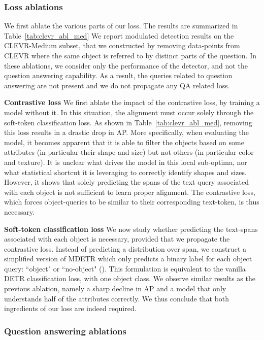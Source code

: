\subsubsection{Loss ablations}
We first ablate the various parts of our loss. The results are summarized in Table~\ref{tab:clevr_abl_med} We report modulated detection results on the CLEVR-Medium subset, that we constructed by removing data-points from CLEVR where the same object is referred to by distinct parts of the question. In these ablations, we consider only the performance of the detector, and not the question answering capability. As a result, the queries related to question answering are not present and we do not propagate any QA related loss.

\textbf{Contrastive loss} We first ablate the impact of the contrastive loss, by training a model without it. In this situation, the alignment must occur solely through the soft-token classification loss. 
As shown in Table~\ref{tab:clevr_abl_med}, removing this loss results in a drastic drop in AP. More specifically, when evaluating the model, it becomes apparent that it is able to filter the objects based on some attributes (in particular their shape and size) but not others (in particular color and texture). It is unclear what drives the model in this local sub-optima, nor what statistical shortcut it is leveraging to correctly identify shapes and sizes. However, it shows that solely predicting the spans of the text query associated with each object is not sufficient to learn proper alignment. The contrastive loss, which forces object-queries to be similar to their corresponding text-token, is thus necessary.

\textbf{Soft-token classification loss}
We now study whether predicting the text-spans associated with each object is necessary, provided that we propagate the contrastive loss. Instead of predicting a distribution over span, we construct a simplified version of MDETR which only predicts a binary label for each object query: ``object" or ``no-object" (). This formulation is equivalent to the vanilla DETR classification loss, with one object class. We observe similar results as the previous ablation, namely a sharp decline in AP and a model that only understands half of the attributes correctly. We thus conclude that both ingredients of our loss are indeed required.

\subsubsection{Question answering ablations}

